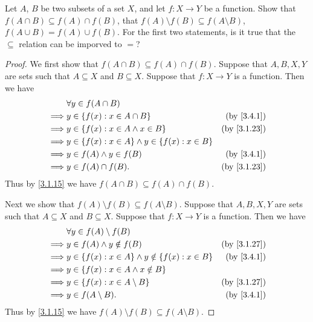 \begin{ex}\label{ex:3.4.3}
  Let \(A\), \(B\) be two subsets of a set \(X\), and let \(f : X \to Y\) be a function.
  Show that \(f(A \cap B) \subseteq f(A) \cap f(B)\), that \(f(A) \setminus f(B) \subseteq f(A \setminus B)\), \(f(A \cup B) = f(A) \cup f(B)\).
  For the first two statements, is it true that the \(\subseteq\) relation can be imporved to \(=\)?
\end{ex}

\begin{proof}
  We first show that \(f(A \cap B) \subseteq f(A) \cap f(B)\).
  Suppose that \(A, B, X, Y\) are sets such that \(A \subseteq X\) and \(B \subseteq X\).
  Suppose that \(f : X \to Y\) is a function.
  Then we have
  \begin{align*}
             & \forall y \in f(A \cap B)                                                           \\
    \implies & y \in \{f(x) : x \in A \cap B\}                         & \text{(by \cref{3.4.1})}  \\
    \implies & y \in \{f(x) : x \in A \land x \in B\}                  & \text{(by \cref{3.1.23})} \\
    \implies & y \in \{f(x) : x \in A\} \land y \in \{f(x) : x \in B\}                             \\
    \implies & y \in f(A) \land y \in f(B)                             & \text{(by \cref{3.4.1})}  \\
    \implies & y \in f(A) \cap f(B).                                   & \text{(by \cref{3.1.23})}
  \end{align*}
  Thus by \cref{3.1.15} we have \(f(A \cap B) \subseteq f(A) \cap f(B)\).

  Next we show that \(f(A) \setminus f(B) \subseteq f(A \setminus B)\).
  Suppose that \(A, B, X, Y\) are sets such that \(A \subseteq X\) and \(B \subseteq X\).
  Suppose that \(f : X \to Y\) is a function.
  Then we have
  \begin{align*}
             & \forall y \in f(A) \setminus f(B)                                                      \\
    \implies & y \in f(A) \land y \notin f(B)                             & \text{(by \cref{3.1.27})} \\
    \implies & y \in \{f(x) : x \in A\} \land y \notin \{f(x) : x \in B\} & \text{(by \cref{3.4.1})}  \\
    \implies & y \in \{f(x) : x \in A \land x \notin B\}                                              \\
    \implies & y \in \{f(x) : x \in A \setminus B\}                       & \text{(by \cref{3.1.27})} \\
    \implies & y \in f(A \setminus B).                                    & \text{(by \cref{3.4.1})}
  \end{align*}
  Thus by \cref{3.1.15} we have \(f(A) \setminus f(B) \subseteq f(A \setminus B)\).


\end{proof}
